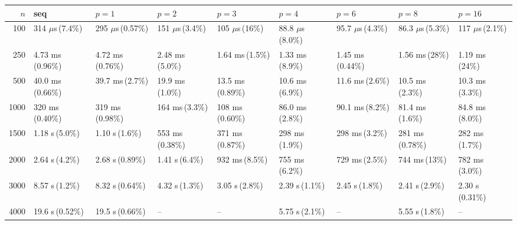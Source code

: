 \begin{tabular}{rllllllll}
\toprule
$n$ & seq & $p{=}1$ & $p{=}2$ & $p{=}3$ & $p{=}4$ & $p{=}6$ & $p{=}8$ & $p{=}16$ \\
\midrule
100 & 314 $\mu$s\,(7.4\%) & 295 $\mu$s\,(0.57\%) & 151 $\mu$s\,(3.4\%) & 105 $\mu$s\,(16\%) & 88.8 $\mu$s\,(8.0\%) & 95.7 $\mu$s\,(4.3\%) & 86.3 $\mu$s\,(5.3\%) & 117 $\mu$s\,(2.1\%) \\
250 & 4.73 ms\,(0.96\%) & 4.72 ms\,(0.76\%) & 2.48 ms\,(5.0\%) & 1.64 ms\,(1.5\%) & 1.33 ms\,(8.9\%) & 1.45 ms\,(0.44\%) & 1.56 ms\,(28\%) & 1.19 ms\,(24\%) \\
500 & 40.0 ms\,(0.66\%) & 39.7 ms\,(2.7\%) & 19.9 ms\,(1.0\%) & 13.5 ms\,(0.89\%) & 10.6 ms\,(6.9\%) & 11.6 ms\,(2.6\%) & 10.5 ms\,(2.3\%) & 10.3 ms\,(3.3\%) \\
1000 & 320 ms\,(0.40\%) & 319 ms\,(0.98\%) & 164 ms\,(3.3\%) & 108 ms\,(0.60\%) & 86.0 ms\,(2.8\%) & 90.1 ms\,(8.2\%) & 81.4 ms\,(1.6\%) & 84.8 ms\,(8.0\%) \\
1500 & 1.18 s\,(5.0\%) & 1.10 s\,(1.6\%) & 553 ms\,(0.38\%) & 371 ms\,(0.87\%) & 298 ms\,(1.9\%) & 298 ms\,(3.2\%) & 281 ms\,(0.78\%) & 282 ms\,(1.7\%) \\
2000 & 2.64 s\,(4.2\%) & 2.68 s\,(0.89\%) & 1.41 s\,(6.4\%) & 932 ms\,(8.5\%) & 755 ms\,(6.2\%) & 729 ms\,(2.5\%) & 744 ms\,(13\%) & 782 ms\,(3.0\%) \\
3000 & 8.57 s\,(1.2\%) & 8.32 s\,(0.64\%) & 4.32 s\,(1.3\%) & 3.05 s\,(2.8\%) & 2.39 s\,(1.1\%) & 2.45 s\,(1.8\%) & 2.41 s\,(2.9\%) & 2.30 s\,(0.31\%) \\
4000 & 19.6 s\,(0.52\%) & 19.5 s\,(0.66\%) & -- & -- & 5.75 s\,(2.1\%) & -- & 5.55 s\,(1.8\%) & -- \\
\bottomrule
\end{tabular}

